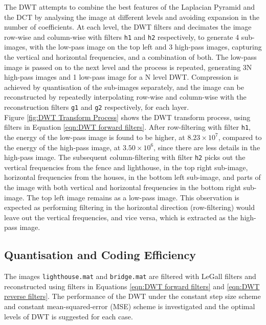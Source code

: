The DWT attempts to combine the best features of the Laplacian Pyramid and the DCT by analysing the image at different levels and avoiding expansion in the number of coefficients. At each level, the DWT filters and decimates the image row-wise and column-wise with filters \texttt{h1} and \texttt{h2} respectively, to generate 4 sub-images, with the low-pass image on the top left and 3 high-pass images, capturing the vertical and horizontal frequencies, and a combination of both. The low-pass image is passed on to the next level and the process is repeated, generating 3N high-pass images and 1 low-pass image for a N level DWT. Compression is achieved by quantisation of the sub-images separately, and the image can be reconstructed by repeatedly interpolating row-wise and column-wise with the reconstruction filters \texttt{g1} and \texttt{g2} respectively, for each layer. \\

Figure \ref{fig:DWT Transform Process} shows the DWT transform process, using filters in Equation \ref{eqn:DWT forward filters}. After row-filtering with filter \texttt{h1}, the energy of the low-pass image is found to be higher, at $8.23\times 10^7$, compared to the energy of the high-pass image, at $3.50\times 10^6$, since there are less details in the high-pass image. The subsequent column-filtering with filter \texttt{h2} picks out the vertical frequencies from the fence and lighthouse, in the top right sub-image, horizontal frequencies from the houses, in the bottom left sub-image, and parts of the image with both vertical and horizontal frequencies in the bottom right sub-image. The top left image remains as a low-pass image. This observation is expected as performing filtering in the horizontal direction (row-filtering) would leave out the vertical frequencies, and vice versa, which is extracted as the high-pass image.\\

\subsection{Quantisation and Coding Efficiency} \label{sec:DWT Quantisation}
\vspace{-2mm}
The images \texttt{lighthouse.mat} and \texttt{bridge.mat} are filtered with LeGall filters and reconstructed using filters in Equations \ref{eqn:DWT forward filters} and \ref{eqn:DWT reverse filters}. The performance of the DWT under the constant step size scheme and constant mean-squared-error (MSE) scheme is investigated and the optimal levels of DWT is suggested for each case. \\


